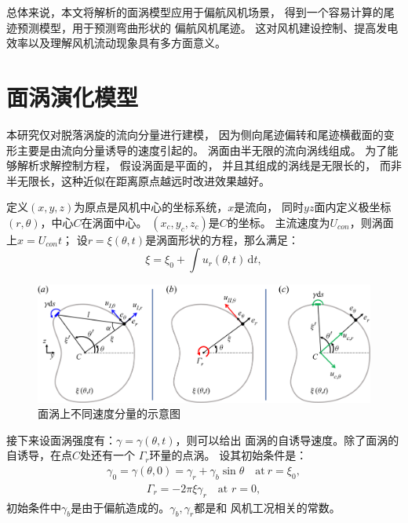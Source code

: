 \documentclass[UTF8,zihao=5]{ctexart} %
\begin{document}
总体来说，本文将解析的面涡模型应用于偏航风机场景，
得到一个容易计算的尾迹预测模型，用于预测弯曲形状的
偏航风机尾迹。
这对风机建设控制、提高发电效率以及理解风机流动现象具有多方面意义。



\section{面涡演化模型}

\renewcommand{\rm}{}

本研究仅对脱落涡旋的流向分量进行建模，
因为侧向尾迹偏转和尾迹横截面的变形主要是由流向分量诱导的速度引起的。
涡面由半无限的流向涡线组成。
为了能够解析求解控制方程，
假设涡面是平面的，
并且其组成的涡线是无限长的，
而非半无限长，这种近似在距离原点越远时改进效果越好。

定义$(x,y,z)$为原点是风机中心的坐标系统，$x$是流向，
同时$yz$面内定义极坐标$(r,\theta)$，中心$C$在涡面中心。
$(x_c,y_c,z_c)$是$C$的坐标。
主流速度为$U_{con}$，则涡面上$x=U_{con}t$；
设$r=\xi (\theta,t)$是涡面形状的方程，那么满足：
\begin{equation} \xi=\xi_0 + \int u_r(\theta,t)\,\textrm{d}t, \end{equation}


\begin{figure}[H]
    \centering
    \includegraphics[width=12cm]{fig1.png}  %
    \caption{面涡上不同速度分量的示意图}
\end{figure}

接下来设面涡强度有：$\gamma =\gamma (\theta,t)$，则可以给出
面涡的自诱导速度。除了面涡的自诱导，在点$C$处还有一个
$\varGamma_r$环量的点涡。
设其初始条件是：
\begin{gather} \gamma_0=\gamma(\theta,0)=\gamma_r+\gamma_b\sin\theta \quad \textrm{at}\ r=\xi_0, \end{gather}
\begin{gather}\varGamma_r={-}2{\rm \pi}\xi\gamma_r \quad\textrm{at } r=0, \end{gather}
初始条件中$\gamma_b$是由于偏航造成的。$\gamma_b,\gamma_r$都是和
风机工况相关的常数。
\end{document}
